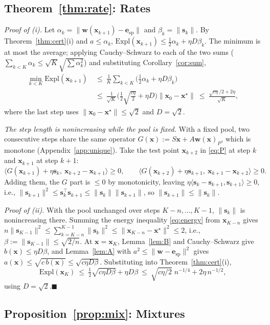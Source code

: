 \documentclass{article}
\theoremstyle{plain}
\theoremstyle{remark}
\newcommand{\Expl}{\mathrm{Expl}}
\newcommand{\bx}{{\bm{x}}}
\newcommand{\bw}{{\bm{w}}}
\newcommand{\be}{{\bm{e}}}
\newcommand{\xs}{\bx^{\star}}
\newcommand{\dx}{{\bm{s}}}
\newcommand{\esp}{\be_{\mathrm{sp}}}
\begin{document}
\subsection{Theorem~\ref{thm:rate}: Rates}
\label{app:rate}

\textit{Proof of (i).} Let $\alpha_k=\|\bw(\bx_{k+1})-\esp\|$ and $\beta_k=\|\dx_k\|$. By Theorem~\ref{thm:cert}(i) and $a\le\alpha_k$, $\Expl(\bx_{k+1})\le\tfrac12\alpha_k+\eta D\beta_k$. The minimum is at most the average; applying Cauchy--Schwarz to each of the two sums ($\sum_{k<K}\alpha_k\le\sqrt K\sqrt{\sum\alpha_k^2}$) and substituting Corollary~\ref{cor:sum},
\begin{align*}
\min_{k<K}\Expl(\bx_{k+1})\ &\le\ \frac1K\sum_{k<K}\Big(\tfrac12\alpha_k+\eta D\beta_k\Big)\\
&\le\ \frac{1}{\sqrt K}\Big(\tfrac12\sqrt{\tfrac{c\eta}{2}}+\eta D\Big)\|\bx_0-\xs\|\ \le\ \frac{\sqrt{c\eta}/2+2\eta}{\sqrt K},
\end{align*}
where the last step uses $\|\bx_0-\xs\|\le\sqrt2$ and $D=\sqrt2$.

\textit{The step length is nonincreasing while the pool is fixed.} With a fixed pool, two consecutive steps share the same operator $G(\bx):=S\bx+A\bw(\bx)_P$, which is monotone (Appendix~\ref{app:unique}). Take the test point $\bx_{k+2}$ in \eqref{eq:P} at step $k$ and $\bx_{k+1}$ at step $k+1$:
\[
\langle G(\bx_{k+1})+\eta\dx_k,\ \bx_{k+2}-\bx_{k+1}\rangle\ge0,\qquad\langle G(\bx_{k+2})+\eta\dx_{k+1},\ \bx_{k+1}-\bx_{k+2}\rangle\ge0 .
\]
Adding them, the $G$ part is $\le0$ by monotonicity, leaving $\eta\langle\dx_k-\dx_{k+1},\dx_{k+1}\rangle\ge0$, i.e., $\|\dx_{k+1}\|^2\le\dx_k^\top\dx_{k+1}\le\|\dx_k\|\|\dx_{k+1}\|$, so $\|\dx_{k+1}\|\le\|\dx_k\|$.

\textit{Proof of (ii).} With the pool unchanged over steps $K-n,\dots,K-1$, $\|\dx_k\|$ is nonincreasing there. Summing the energy inequality \eqref{eq:energy} from $\bx_{K-n}$ gives $n\|\dx_{K-1}\|^2\le\sum_{k=K-n}^{K-1}\|\dx_k\|^2\le\|\bx_{K-n}-\xs\|^2\le2$, i.e., $\beta:=\|\dx_{K-1}\|\le\sqrt{2/n}$. At $\bx=\bx_K$, Lemma~\ref{lem:B} and Cauchy--Schwarz give $b(\bx)\le\eta D\beta$, and Lemma~\ref{lem:A} with $a^2\le\|\bw-\esp\|^2$ gives $a(\bx)\le\sqrt{c\,b(\bx)}\le\sqrt{c\eta D\beta}$. Substituting into Theorem~\ref{thm:cert}(i),
\[
\Expl(\bx_K)\ \le\ \tfrac12\sqrt{c\eta D\beta}+\eta D\beta\ \le\ \sqrt{c\eta/2}\;n^{-1/4}+2\eta\,n^{-1/2},
\]
using $D=\sqrt2$.\hfill$\blacksquare$

\subsection{Proposition~\ref{prop:mix}: Mixtures}
\label{app:mix}
\end{document}
